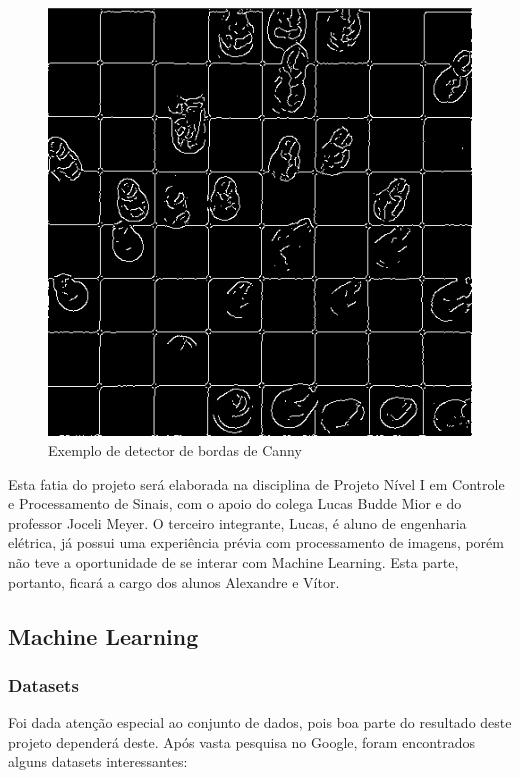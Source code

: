 \documentclass[a4paper,12pt,twoside]{article}
\begin{document}
\begin{figure}[h!]
\centering
  \includegraphics[width=\linewidth]{fig/detector.png}
\caption{Exemplo de detector de bordas de Canny}
\label{fig:detector}
\end{figure}

Esta fatia do projeto será elaborada na disciplina de Projeto Nível I em Controle e Processamento de Sinais,
com o apoio do colega Lucas Budde Mior e do professor Joceli Meyer. 
O terceiro integrante, Lucas, é aluno de engenharia elétrica, já possui uma experiência prévia com processamento de imagens, 
porém não teve a oportunidade de se interar com Machine Learning. 
Esta parte, portanto, ficará a cargo dos alunos Alexandre e Vítor.

\subsection{Machine Learning}

\subsubsection{Datasets}

Foi dada atenção especial ao conjunto de dados, pois boa parte do resultado deste projeto dependerá deste. Após vasta pesquisa no Google, foram encontrados alguns datasets interessantes:
\end{document}
